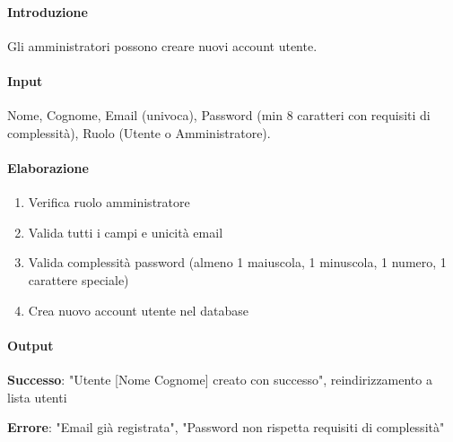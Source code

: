 \begin{reqbox}[title=REQ-FUN-21: Creazione Utenze (solo Admin)]
\label{subsubsec:req-creazione-utenze}

\paragraph{Introduzione}
Gli amministratori possono creare nuovi account utente.

\paragraph{Input}
Nome, Cognome, Email (univoca), Password (min 8 caratteri con requisiti di complessità), Ruolo (Utente o Amministratore).

\paragraph{Elaborazione}
\begin{enumerate}[leftmargin=1.1em]
\item Verifica ruolo amministratore
\item Valida tutti i campi e unicità email
\item Valida complessità password (almeno 1 maiuscola, 1 minuscola, 1 numero, 1 carattere speciale)
\item Crea nuovo account utente nel database
\end{enumerate}

\paragraph{Output}
\textbf{Successo}: "Utente [Nome Cognome] creato con successo", reindirizzamento a lista utenti

\textbf{Errore}: "Email già registrata", "Password non rispetta requisiti di complessità"

\end{reqbox}

\vspace{0.5cm}

\newpage


